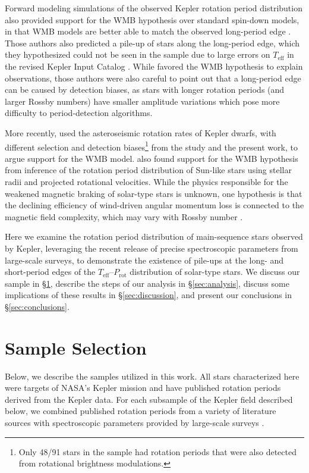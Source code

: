 \documentclass[linenumbers,trackchanges,twocolumn]{aastex631}
\newcommand{\teff}{\ensuremath{T_{\mathrm{eff}}}\xspace}
\newcommand{\prot}{\ensuremath{P_\mathrm{rot}}\xspace}
\begin{document}
Forward modeling simulations of the observed Kepler rotation period distribution also provided support for the WMB hypothesis over standard spin-down models, in that WMB models are better able to match the observed long-period edge \citep{vanSaders2019}. Those authors also predicted a pile-up of stars along the long-period edge, which they hypothesized could not be seen in the \citet{McQuillan2014} sample due to large errors on \teff in the revised Kepler Input Catalog \citep[KIC,][]{Huber2014}. While \citet{vanSaders2019} favored the WMB hypothesis to explain observations, those authors were also careful to point out that a long-period edge can be caused by detection biases, as stars with longer rotation periods (and larger Rossby numbers) have smaller amplitude variations which pose more difficulty to period-detection algorithms. 

More recently, \citet{Hall2021} used the asteroseismic rotation rates of Kepler dwarfs, with different selection and detection biases\footnote{Only 48/91 stars in the \citet{Hall2021} sample had rotation periods that were also detected from rotational brightness modulations.} from the \citet{vanSaders2019} study and the present work, to argue support for the WMB model. \citet{Masuda2021} also found support for the WMB hypothesis from inference of the rotation period distribution of Sun-like stars using stellar radii and projected rotational velocities.  While the physics responsible for the weakened magnetic braking of solar-type stars is unknown, one hypothesis is that the declining efficiency of wind-driven angular momentum loss is connected to the magnetic field complexity, which may vary with Rossby number \citep[e.g.][]{Reville2015, vanSaders2016, Garraffo2016, Metcalfe2016, Metcalfe2019}.  

Here we examine the rotation period distribution of main-sequence stars observed by Kepler, leveraging the recent release of precise spectroscopic parameters from large-scale surveys, to demonstrate the existence of pile-ups at the long- and short-period edges of the \teff--\prot distribution of solar-type stars. We discuss our sample in \S\ref{sec:sample}, describe the steps of our analysis in \S\ref{sec:analysis}, discuss some implications of these results in \S\ref{sec:discussion}, and present our conclusions in \S\ref{sec:conclusions}.

\section{Sample Selection} \label{sec:sample}
Below, we describe the samples utilized in this work. All stars characterized here were targets of NASA's Kepler mission \citep{Borucki2010} and have published rotation periods derived from the Kepler data. For each subsample of the Kepler field described below, we combined published rotation periods from a variety of literature sources with spectroscopic parameters provided by large-scale surveys .
\end{document}
